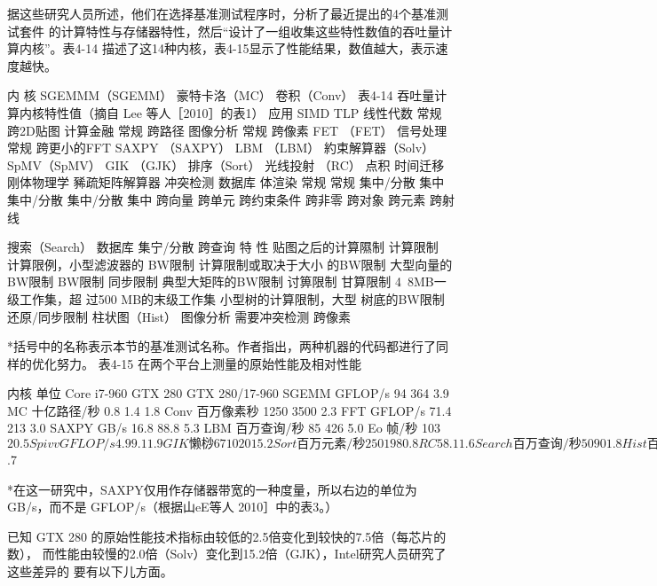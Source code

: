 据这些研究人员所述，他们在选择基准测试程序时，分析了最近提出的4个基准测试套件
的计算特性与存储器特性，然后“设计了一组收集这些特性数值的吞吐量计算内核”。表4-14
描述了这14种内核，表4-15显示了性能结果，数值越大，表示速度越快。

内
核
SGEMMM（SGEMM）
豪特卡洛（MC）
卷积（Conv）
表4-14 吞吐量计算内核特性值（摘自 Lee 等人［2010］的表1）
应用
SIMD
TLP
线性代数
常规
跨2D贴图
计算金融
常规
跨路径
图像分析
常规
跨像素
FET （FET）
信号处理
常规
跨更小的FFT
SAXPY （SAXPY）
LBM （LBM）
約束解算器（Solv）
SpMV（SpMV）
GIK （GJK）
排序（Sort）
光线投射 （RC）
点积
时间迁移
刚体物理学
豨疏矩阵解算器
冲突检测
数据库
体渲染
常规
常规
集中/分散
集中
集中/分散
集中/分散
集中
跨向量
跨单元
跨约束条件
跨非零
跨对象
跨元素
跨射线

搜索（Search）
数据库
集宁/分散
跨查询
特
性
贴图之后的计算隰制
计算限制
计算限例，小型滤波器的
BW限制
计算限制或取决于大小
的BW限制
大型向量的BW限制
BW限制
同步限制
典型大矩阵的BW限制
讨箅限制
甘算限制
4~8MB一级工作集，超
过500 MB的末级工作集
小型树的计算限制，大型
树底的BW限制
还原/同步限制
柱状图（Hist）
图像分析
需要冲突检测
跨像素

*括号中的名称表示本节的基准测试名称。作者指出，两种机器的代码都进行了同样的优化努力。
表4-15 在两个平台上测量的原始性能及相对性能

内核
单位
Core i7-960
GTX 280
GTX 280/17-960
SGEMM
GFLOP/s
94
364
3.9
MC
十亿路径/秒
0.8
1.4
1.8
Conv
百万像素秒
1250
3500
2.3
FFT
GFLOP/s
71.4
213
3.0
SAXPY
GB/s
16.8
88.8
5.3
LBM
百万查询/秒
85
426
5.0
Eo
帧/秒
103
$2
0.5
Spivv
GFLOP/s
4.9
9.1
1.9
GIK
懒桫
67
1020
15.2
Sort
百万元素/秒
250
198
0.8
RC
5
8.1
1.6
Search
百万查询/秒
50
90
1.8
Hist
百万像素
1517
2583
1.7
Bilat
百万像素/
83
475
$.7

*在这一研究中，SAXPY仅用作存储器带宽的一种度量，所以右边的单位为 GB/s，而不是 GFLOP/s（根据山eE等人
2010］中的表3。）

已知 GTX 280 的原始性能技术指标由较低的2.5倍变化到较快的7.5倍（每芯片的数），
而性能由较慢的2.0倍（Solv）变化到15.2倍（GJK），Intel研究人员研究了这些差异的
要有以下儿方面。

